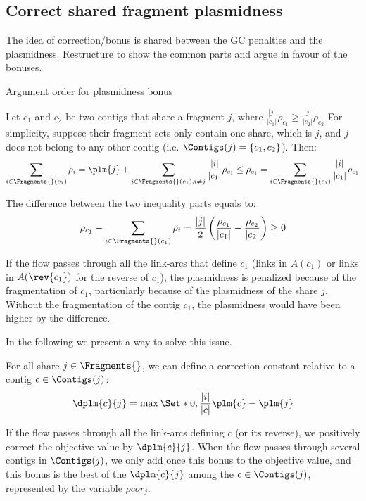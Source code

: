 \subsection{Correct shared fragment plasmidness}

\begin{refactorbox}
  The idea of correction/bonus is shared between the GC penalties and the plasmidness.
  Restructure to show the common parts and argue in favour of the bonuses.
\end{refactorbox}

\begin{fixmebox}
  Argument order for plasmidness bonus
\end{fixmebox}

Let \(c_1\) and \(c_2\) be two contigs that share a fragment \(j\), where \(\frac{ |j| }{ |c_1| } \rho_{c_1} \geq \frac{ |j| }{ |c_2| } \rho_{c_2}\)
For simplicity, suppose their fragment sets only contain one share, which is \(j\), and \(j\) does not belong to any other contig (i.e. \(\Contigs(j) = \{c_1, c_2\} \)).
Then:
\[
  \sum_{i \in \Fragments{}(c_1) } \rho_{i} = \plm{j} + \sum_{i \in \Fragments{}(c_1), i \neq j} \frac{ |i| }{ |c_1| } \rho_{c_1} \leq \rho_{c_1} = \sum_{i \in \Fragments{}(c_1) } \frac{ |i| }{ |c_1| } \rho_{c_1}
\]

The difference between the two inequality parts equals to:
\[
  \rho_{c_1} - \sum_{i \in \Fragments{}(c_1) } \rho_{i} = \frac{ |j| }{2} \left(\frac{ \rho_{c_1} }{ |c_1| } - \frac{ \rho_{c_2} }{ |c_2| } \right) \geq 0
\]

If the flow passes through all the link-arcs that define \(c_1\) (links in \(A(c_1)\) or links in \(A(\rev{c_1})\) for the reverse of \(c_1\)), the plasmidness is penalized because of the fragmentation of \(c_1\), particularly because of the plasmidness of the share \(j\).
Without the fragmentation of the contig \(c_1\), the plasmidness would have been higher by the difference.

In the following we present a way to solve this issue.

For all share \(j \in \Fragments{}\), we can define a correction constant relative to a contig \(c \in \Contigs(j)\):
\[
  \dplm{c}{j} = \max \Set*{0, \frac{ |i| }{ |c| }\plm{c} - \plm{j}}
\]

If the flow passes through all the link-arcs defining \(c\) (or its reverse), we positively correct the objective value by \(\dplm{c}{j}\).
When the flow passes through several contigs in \(\Contigs(j)\), we only add once this bonus to the objective value, and this bonus is the best of the \(\dplm{c}{j}\) among the \(c \in \Contigs(j)\), represented by the variable \(\rho cor_j\).

